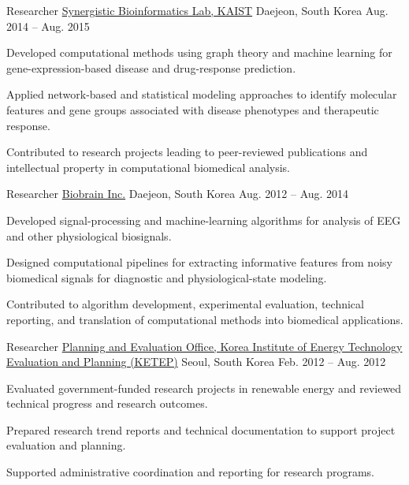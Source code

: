 \begin{cventries}
\cventry
{Researcher} %
{\href{https://synbi.kaist.ac.kr/}{Synergistic Bioinformatics Lab, KAIST}} %
{Daejeon, South Korea} %
{Aug. 2014 -- Aug. 2015} %
{
	\begin{cvitems} %
		\item {Developed computational methods using graph theory and machine learning for gene-expression-based disease and drug-response prediction.}
		\item {Applied network-based and statistical modeling approaches to identify molecular features and gene groups associated with disease phenotypes and therapeutic response.}
		\item {Contributed to research projects leading to peer-reviewed publications and intellectual property in computational biomedical analysis.}
	\end{cvitems}
}

\cventry
{Researcher} %
{\href{https://biobrain.kr/}{Biobrain Inc.}} %
{Daejeon, South Korea} %
{Aug. 2012 -- Aug. 2014} %
{
	\begin{cvitems} %
		\item {Developed signal-processing and machine-learning algorithms for analysis of EEG and other physiological biosignals.}
		\item {Designed computational pipelines for extracting informative features from noisy biomedical signals for diagnostic and physiological-state modeling.}
		\item {Contributed to algorithm development, experimental evaluation, technical reporting, and translation of computational methods into biomedical applications.}
	\end{cvitems}
}

\cventry
{Researcher} %
{\href{https://www.ketep.re.kr/}{Planning and Evaluation Office, Korea Institute of Energy Technology Evaluation and Planning (KETEP)}} %
{Seoul, South Korea} %
{Feb. 2012 -- Aug. 2012} %
{
	\begin{cvitems} %
		\item {Evaluated government-funded research projects in renewable energy and reviewed technical progress and research outcomes.}
		\item {Prepared research trend reports and technical documentation to support project evaluation and planning.}
		\item {Supported administrative coordination and reporting for research programs.}
	\end{cvitems}
}


\end{cventries}

